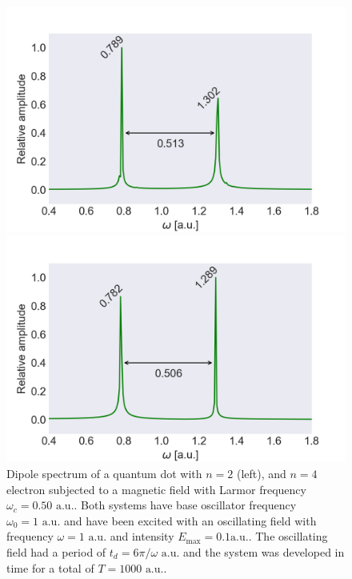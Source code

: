 \begin{figure}[!h]
    \centering
    \begin{minipage}{0.49\textwidth}
        \includegraphics[clip=2em 0em 10em 0em, width=\textwidth]
        {results/figures/B_field/n=2/b_spectrum_omc050.png}
    \end{minipage}\hfill 
    \begin{minipage}{0.49\textwidth}
        \includegraphics[clip=0em 0em 10em 0em, width=\textwidth]
        {results/figures/B_field/n=4/b_spectrum_n=4_omc=050.png}
    \end{minipage}
    \caption{Dipole spectrum of a quantum dot with $n=2$ (left), and $n=4$ electron 
    subjected to a magnetic field with Larmor frequency $\omega_c=0.50 \text{ a.u.}$.
    Both systems have base oscillator frequency $\omega_0=1 \text{ a.u.}$ and 
    have been excited with an oscillating field with frequency $\omega = 1 \text{ a.u.}$
    and intensity $E_\text{max} = 0.1 \text{a.u.}$. The oscillating field had a period of 
    $t_d = 6\pi/\omega \text{ a.u.}$ and the system was developed in time for a total 
    of $T = 1000 \text{ a.u.}$.}
    \label{fig:b_omc050}
\end{figure}

